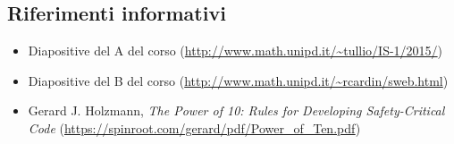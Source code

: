 \subsection{Riferimenti informativi}
\begin{itemize}
\item Diapositive del  A del corso (\url{http://www.math.unipd.it/~tullio/IS-1/2015/})
\item Diapositive del  B del corso (\url{http://www.math.unipd.it/~rcardin/sweb.html})
\item Gerard J. Holzmann, \textit{The Power of 10: Rules for Developing Safety-Critical Code} 
	(\url{https://spinroot.com/gerard/pdf/Power_of_Ten.pdf})
\end{itemize}
